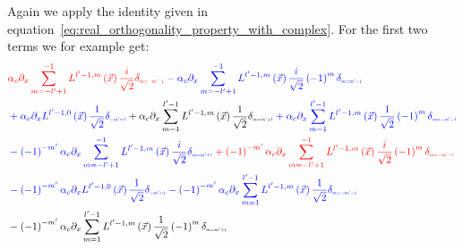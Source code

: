 \documentclass[10pt]{scrartcl}
\begin{document}
Again we apply the identity given in equation~\ref{eq:real_orthogonality_property_with_complex}. For the first two terms we for example get:
\begin{align*}
&
\mathcolor{red}{}
\mathcolor{red}{\alpha_c\partial_x
\sum_{m=-l'+1}^{-1}L^{l'-1,m}\left (\vec{x}\right)
\frac{i}{\sqrt{2}}
\delta_{\scaleto{m=-m'-1}{4pt}}
}
\mathcolor{blue}{
-
}
\mathcolor{blue}{
\alpha_c\partial_x
\sum_{m=-l'+1}^{-1}L^{l'-1,m}\left (\vec{x}\right)
\frac{i}{\sqrt{2}}
\left({-1}\right)^{m}
\delta_{\scaleto{m=m'+1}{4pt}}
}
\\&
\mathcolor{blue}
{
+
}
\mathcolor{blue}
{
\alpha_c\partial_x
L^{l'-1,0}\left (\vec{x}\right)
\frac{1}{\sqrt{2}}
\delta_{\scaleto{-m'=1}{4pt}}
}
\mathcolor{black}
{
+
}
\mathcolor{black}
{
\alpha_c\partial_x
\sum_{m=1}^{l'-1}L^{l'-1,m}\left (\vec{x}\right)
\frac{1}{\sqrt{2}}
\delta_{\scaleto{m=m'+1}{4pt}}
}
\mathcolor{blue}
{
+
}
\mathcolor{blue}
{
\alpha_c\partial_x
\sum_{m=1}^{l'-1}L^{l'-1,m}\left (\vec{x}\right)
\frac{1}{\sqrt{2}}
\left({-1}\right)^{m}
\delta_{\scaleto{m=-m'-1}{4pt}}
}
\\&
\mathcolor{blue}
{
-\left({-1}\right)^{-m'}
}
\mathcolor{blue}{
\alpha_c\partial_x
\sum_{m=-l'+1}^{-1}L^{l'-1,m}\left (\vec{x}\right)
\frac{i}{\sqrt{2}}
\delta_{\scaleto{m=m'+1}{4pt}}
}
\mathcolor{red}
{
+\left({-1}\right)^{-m'}
}
\mathcolor{red}
{
\alpha_c\partial_x
\sum_{m=-l'+1}^{-1}L^{l'-1,m}\left (\vec{x}\right)
\frac{i}{\sqrt{2}}
\left({-1}\right)^{m}
\delta_{\scaleto{m=-m'-1}{4pt}}
}
\\&
\mathcolor{blue}
{
-
\left({-1}\right)^{-m'}
}
\mathcolor{blue}
{
\alpha_c\partial_x
L^{l'-1,0}\left (\vec{x}\right)
\frac{1}{\sqrt{2}}
\delta_{\scaleto{-m'=1}{4pt}}
}
\mathcolor{blue}
{
-
\left({-1}\right)^{-m'}
}
\mathcolor{blue}
{
\alpha_c\partial_x
\sum_{m=1}^{l'-1}L^{l'-1,m}\left (\vec{x}\right)
\frac{1}{\sqrt{2}}
\delta_{\scaleto{m=-m'-1}{4pt}}
}
\\&
\mathcolor{black}
{
-
\left({-1}\right)^{-m'}
}
\mathcolor{black}
{
\alpha_c\partial_x
\sum_{m=1}^{l'-1}L^{l'-1,m}\left (\vec{x}\right)
\frac{1}{\sqrt{2}}
\left({-1}\right)^{m}
\delta_{\scaleto{m=m'+1}{4pt}}
}
\end{align*}
\end{document}
